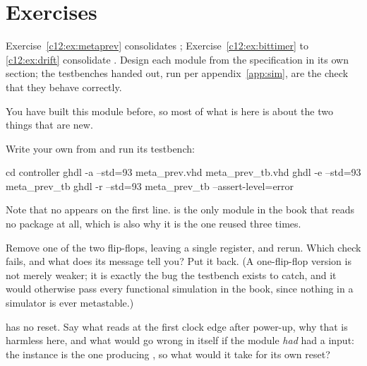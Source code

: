 
\section{Exercises}
\label{c12:sec:exercises}

\begin{aside}
Exercise~\ref{c12:ex:metaprev} consolidates ;
Exercise~\ref{c12:ex:bittimer} to \ref{c12:ex:drift} consolidate . Design
each module from the specification in its own section; the testbenches handed out, run per
appendix~\ref{app:sim}, are the check that they behave correctly.
\end{aside}


\label{c12:ex:metaprev}
You have built this module before, so most of what is here is about the two things that are new.

 Write your own  from  and run its testbench:

\begin{shell}
cd controller
ghdl -a --std=93 meta_prev.vhd meta_prev_tb.vhd
ghdl -e --std=93 meta_prev_tb
ghdl -r --std=93 meta_prev_tb --assert-level=error
\end{shell}

Note that no  appears on the first line.  is the only module in the
book that reads no package at all, which is also why it is the one reused three times.

 Remove one of the two flip-flops, leaving a single register, and rerun. Which check fails,
and what does its message tell you? Put it back. (A one-flip-flop version is not merely weaker; it is
exactly the bug the testbench exists to catch, and it would otherwise pass every functional
simulation in the book, since nothing in a simulator is ever metastable.)

  has no reset. Say what  reads at the first clock edge after
power-up, why that is harmless here, and what would go wrong in  itself if the
module \emph{had} had a  input: the  instance is the one producing
, so what would it take for its own reset?

